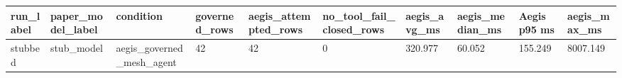 \begin{tabular}{llllllllll}
 \hline
run\_label & paper\_model\_label & condition & governed\_rows & aegis\_attempted\_rows & no\_tool\_fail\_closed\_rows & aegis\_avg\_ms & aegis\_median\_ms & Aegis p95 ms & aegis\_max\_ms \\
 \hline
stubbed & stub\_model & aegis\_governed\_mesh\_agent & 42 & 42 & 0 & 320.977 & 60.052 & 155.249 & 8007.149 \\
 \hline
\end{tabular}
